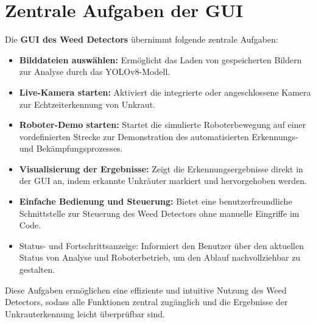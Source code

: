 \documentclass[12pt, a4paper]{scrreprt}
\begin{document}
\section{Zentrale Aufgaben der GUI}
Die \textbf{GUI des Weed Detectors} übernimmt folgende zentrale Aufgaben:
\begin{itemize}
    \item \textbf{Bilddateien auswählen:} Ermöglicht das Laden von gespeicherten Bildern zur Analyse durch das YOLOv8-Modell.
    \item \textbf{Live-Kamera starten:} Aktiviert die integrierte oder angeschlossene Kamera zur Echtzeiterkennung von Unkraut.
    \item \textbf{Roboter-Demo starten:} Startet die simulierte Roboterbewegung auf einer vordefinierten Strecke zur Demonstration des automatisierten Erkennungs- und Bekämpfungsprozesses.
    \item \textbf{Visualisierung der Ergebnisse:} Zeigt die Erkennungsergebnisse direkt in der GUI an, indem erkannte Unkräuter markiert und hervorgehoben werden.
    \item \textbf{Einfache Bedienung und Steuerung:} Bietet eine benutzerfreundliche Schnittstelle zur Steuerung des Weed Detectors ohne manuelle Eingriffe im Code.
    \item {Status- und Fortschrittsanzeige:} Informiert den Benutzer über den aktuellen Status von Analyse und Roboterbetrieb, um den Ablauf nachvollziehbar zu gestalten.
\end{itemize}
Diese Aufgaben ermöglichen eine effiziente und intuitive Nutzung des Weed Detectors, sodass alle Funktionen zentral zugänglich und die Ergebnisse der Unkrauterkennung leicht überprüfbar sind.
\end{document}
